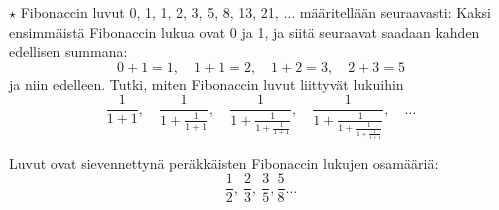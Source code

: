 \begin{tehtavasivu}
\begin{tehtava}
\end{tehtava}

\begin{tehtava}
	$\star$ Fibonaccin luvut 0, 1, 1, 2, 3, 5, 8, 13, 21, $\ldots$ määritellään seuraavasti: Kaksi ensimmäistä
	Fibonaccin lukua ovat 0 ja 1, ja siitä seuraavat saadaan kahden
	edellisen summana: \[ 0+1=1, \quad 1+1=2, \quad 1+2 = 3, \quad 2+3=5 \] 
	ja niin edelleen. 
	Tutki, miten Fibonaccin luvut liittyvät lukuihin
	\[ \frac{1}{1+1}, \quad \frac{1}{1+\frac{1}{1+1}}, \quad
	\frac{1}{1+\frac{1}{1+\frac{1}{1+1}}}, \quad 
	\frac{1}{1+\frac{1}{1+\frac{1}{1+\frac{1}{1+1}}}}, \quad \ldots\]
	\begin{vastaus}
		Luvut ovat sievennettynä peräkkäisten Fibonaccin
		lukujen osamääriä:
		\[\frac{1}{2}, \ \frac{2}{3}, \ \frac{3}{5}, \frac{5}{8} \ldots  \]
	\end{vastaus}
\end{tehtava}


\end{tehtavasivu}
